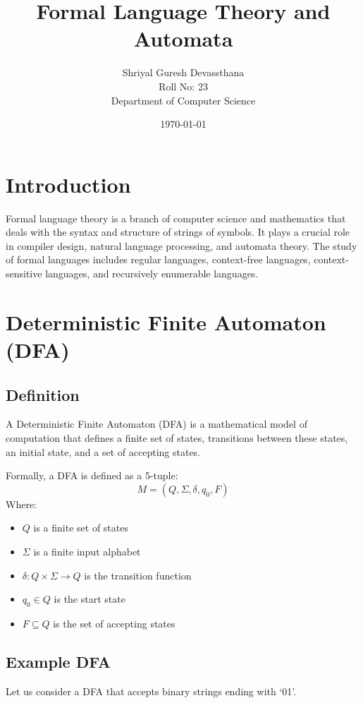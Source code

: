 \documentclass[12pt]{article}
\title{\textbf{Formal Language Theory and Automata}}
\author{Shriyal Guresh Devassthana \\ Roll No: 23\\ Department of Computer Science}
\date{\today}
\begin{document}
\maketitle

\tableofcontents
\newpage

\section{Introduction}
Formal language theory is a branch of computer science and mathematics that deals with the syntax and structure of strings of symbols. It plays a crucial role in compiler design, natural language processing, and automata theory. The study of formal languages includes regular languages, context-free languages, context-sensitive languages, and recursively enumerable languages.

\section{Deterministic Finite Automaton (DFA)}
\subsection{Definition}
A Deterministic Finite Automaton (DFA) is a mathematical model of computation that defines a finite set of states, transitions between these states, an initial state, and a set of accepting states.

Formally, a DFA is defined as a 5-tuple:
\[ M = (Q, \Sigma, \delta, q_0, F) \]
Where:
\begin{itemize}
    \item $Q$ is a finite set of states
    \item $\Sigma$ is a finite input alphabet
    \item $\delta: Q \times \Sigma \rightarrow Q$ is the transition function
    \item $q_0 \in Q$ is the start state
    \item $F \subseteq Q$ is the set of accepting states
\end{itemize}

\subsection{Example DFA}
Let us consider a DFA that accepts binary strings ending with `01'.

\begin{center}
\end{center}
\end{document}
